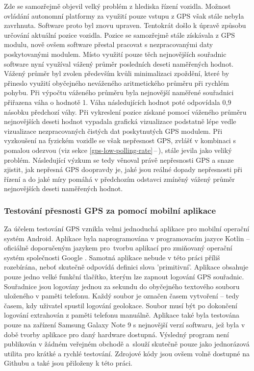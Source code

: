 \documentclass[czech, bachelor]{diploma}
\newcommand{\filipref}[1]{\ref{#1}\,--\,\nameref{#1}}
\begin{document}
Zde se samozřejmě objevil velký problém z hlediska řízení vozidla. Možnost ovládání autonomní platformy za využití pouze vstupu
z GPS však stále nebyla zavrhnuta. Software proto byl znovu upraven. Tentokrát došlo k úpravě způsobu určování aktuální pozice
vozidla. Pozice se samozřejmě stále získávala z GPS modulu, nově ovšem software přestal pracovat s nezpracovanými daty
poskytovanými modulem. Místo využití pouze těch nejnovějších souřadnic software nyní využíval vážený průměr posledních deseti
naměřených hodnot. Vážený průměr byl zvolen především kvůli minimalizaci zpoždění, které by přineslo využití obyčejného neváženého
aritmetického průměru při rychlém pohybu. Při výpočtu váženého průměru byla nejnovější naměřené souřadnici přiřazena váha
o hodnotě 1. Váha následujících hodnot poté odpovídala 0,9 násobku předchozí váhy. Při vykreslení pozice získané pomocí váženého
průměru nejnovějších deseti hodnot vypadala grafická vizualizace podstatně lépe vedle vizualizace nezpracovaných čistých dat
poskytnutých GPS modulem. Při vyzkoušení na fyzickém vozidle se však nepřesnost GPS, zvlášť v kombinaci s pomalou odezvou (viz
sekce \filipref{gps-low-polling-rate}), stále jevila jako veliký problém. Následující výzkum se tedy věnoval právě nepřesnosti GPS
a snaze zjistit, jak nepřesná GPS doopravdy je, jaké jsou reálné dopady nepřesnosti při řízení a do jaké míry pomáhá v předchozím
odstavci zmíněný vážený průměr nejnovějších deseti naměřených hodnot.

\subsubsection{Testování přesnosti GPS za pomocí mobilní aplikace}

Za účelem testování GPS vznikla velmi jednoduchá aplikace pro mobilní operační systém Android. Aplikace byla naprogramována
v programovacím jazyce Kotlin -- oficiálně doporučeným jazykem pro~tvorbu aplikací pro zmiňovaný operační systém společnosti
Google \cite{kotlin-android-source}. Samotná aplikace nebude v této práci příliš rozebírána, neboť skutečně odpovídá definici
slova 'primitivní'. Aplikace obsahuje pouze jedno velké funkční tlačítko, kterým lze zapnout logování GPS souřadnic. Souřadnice
jsou logovány jednou za sekundu do obyčejného textového souboru uloženého v paměti telefonu. Každý soubor je označen časem
vytvoření -- tedy časem, kdy uživatel spustil logování geolokace. Soubor musí být po dokončení logování extrahován z paměti
telefonu manuálně. Aplikace také byla testována pouze na zařízení Samsung Galaxy Note 9 s nejnovější verzí softwaru, jež byla
v době tvorby aplikace pro daný hardware dostupná. Výsledný program není publikován v žádném veřejném obchodě a~slouží skutečně
pouze jako jednorázová utilita pro krátké a rychlé testování. Zdrojové kódy jsou ovšem volně dostupné na Githubu
\cite{geologger-source} a také jsou přiloženy k této práci.
\end{document}
